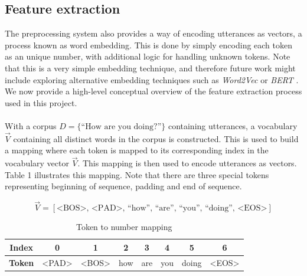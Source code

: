\documentclass{article}
\begin{document}
\subsection*{Feature extraction}
The preprocessing system also provides a way of encoding utterances as
vectors, a process known as word embedding. This is done by simply
encoding each token as an unique number, with additional logic for handling
unknown tokens. Note that this is a very simple embedding technique, and
therefore future work might include exploring alternative embedding techniques
such as \emph{Word2Vec} \cite{word2vec} or \emph{BERT} \cite{bert2018}.
We now provide a high-level conceptual overview of the feature extraction
process used in this project.

\paragraph{}
With a corpus $D = \{\text{``How are you doing?''}\}$ containing utterances, 
a vocabulary $\vec{V}$ containing all distinct words in the corpus is
constructed. This is used to build a mapping where each token is mapped to
its corresponding index in the vocabulary vector $\vec{V}$. This mapping is
then used to encode utterances as vectors. Table 1 illustrates
this mapping. Note that there are three special tokens representing beginning
of sequence, padding and end of sequence.

\begin{equation}
   \vec{V} = [ \textrm{<BOS>},\, \textrm{<PAD>},\, \textrm{``how''},\,
               \textrm{``are''},\, \textrm{``you''},\, \textrm{``doing''},\,
               \textrm{<EOS>}]
 \end{equation}

\begin{table}[hbt]
  \begin{center}
    \begin{tabular}{c|c|c|c|c|c|c|c}
      \textbf{Index} & 0 & 1 & 2 & 3 & 4 & 5 & 6 \\
      \hline
      \textbf{Token} & <PAD> & <BOS> & how & are & you & doing & <EOS> \\
    \end{tabular}
  \end{center}
  \label{tab:tok2num}
  \caption{Token to number mapping}
\end{table}
\end{document}
